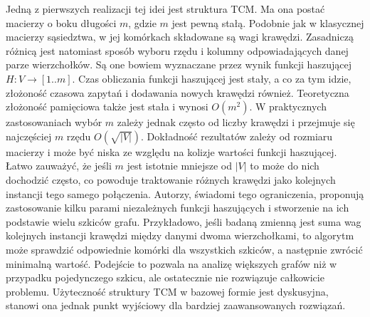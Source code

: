     Jedną z pierwszych realizacji tej idei jest struktura TCM\cite{Tang_Chen_Mitra_2016}. Ma ona postać macierzy o boku długości $m$, gdzie $m$ jest pewną stałą. Podobnie jak w klasycznej macierzy sąsiedztwa, w jej komórkach składowane są wagi krawędzi. Zasadniczą różnicą jest natomiast sposób wyboru rzędu i kolumny odpowiadających danej parze wierzchołków. Są one bowiem wyznaczane przez wynik funkcji haszującej $H : V \rightarrow [1..m]$. Czas obliczania funkcji haszującej jest stały, a co za tym idzie, złożoność czasowa zapytań i dodawania nowych krawędzi również. Teoretyczna złożoność pamięciowa także jest stała i wynosi $O(m^2)$. W praktycznych zastosowaniach wybór $m$ zależy jednak często od liczby krawędzi i przejmuje się najczęściej $m$ rzędu $O(\sqrt{|V|})$. Dokładność rezultatów zależy od rozmiaru macierzy i może być niska ze względu na kolizje wartości funkcji haszującej. Łatwo zauważyć, że jeśli $m$ jest istotnie mniejsze od $|V|$ to może do nich dochodzić często, co powoduje traktowanie różnych krawędzi jako kolejnych instancji tego samego połączenia. Autorzy, świadomi tego ograniczenia, proponują zastosowanie kilku parami niezależnych funkcji haszujących i stworzenie na ich podstawie wielu szkiców grafu. Przykładowo, jeśli badaną zmienną jest suma wag kolejnych instancji krawędzi między danymi dwoma wierzchołkami, to algorytm może sprawdzić odpowiednie komórki dla wszystkich szkiców, a następnie zwrócić minimalną wartość. Podejście to pozwala na analizę większych grafów niż w przypadku pojedynczego szkicu, ale ostatecznie nie rozwiązuje całkowicie problemu. Użyteczność struktury TCM w bazowej formie jest dyskusyjna, stanowi ona jednak punkt wyjściowy dla bardziej zaawansowanych rozwiązań.

